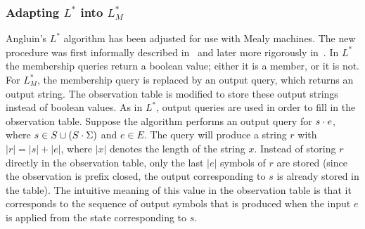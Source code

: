 \subsubsection {Adapting $L^*$ into $L^*_{M}$}
Angluin's $L^*$ algorithm has been adjusted for use with Mealy machines. The new
procedure was first informally described in~\cite{Margaria2004} and later more
rigorously in~\cite{Shahbaz2009}. In $L^*$ the membership queries return a
boolean value; either it is a member, or it is not. For $L^*_{M}$, the membership
query is replaced by an output query, which returns an output string. The
observation table is modified to store these output strings instead of boolean
values. As in $L^*$, output queries are used in order to fill in the observation
table. Suppose the algorithm performs an output query for $s \cdot e$, where
$s \in S \cup (S \cdot \Sigma)$ and $e \in E$. The query will produce a string
$r$ with $|r| = |s| + |e|$, where $|x|$ denotes the length of the string $x$.
Instead of storing $r$ directly in the observation table, only the last $|e|$
symbols of $r$ are stored (since the observation is prefix closed, the output
corresponding to $s$ is already stored in the table). The intuitive meaning of
this value in the observation table is that it corresponds to the sequence of
output symbols that is produced when the input $e$ is applied from the state
corresponding to $s$.


